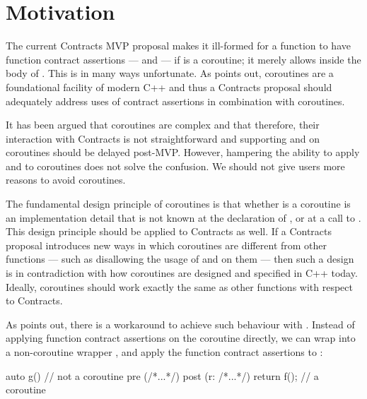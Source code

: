 \section{Motivation}
\label{intro}

The current Contracts MVP proposal \cite{P2900R8} makes it ill-formed for a function  to have function contract assertions ---  and  --- if  is a coroutine; it merely allows  inside the body of . This is in many ways unfortunate. As \cite{P3173R0} points out, coroutines are a foundational facility of modern C++ and thus a Contracts proposal should adequately address uses of contract assertions in combination with coroutines.

It has been argued that coroutines are complex and that therefore, their interaction with Contracts is not straightforward and supporting  and  on coroutines should be delayed post-MVP. However, hampering the ability to apply  and  to coroutines does not solve the confusion. We should not give users more reasons to avoid coroutines.

The fundamental design principle of coroutines is that whether  is a coroutine is an implementation detail that is not known at the declaration of , or at a call to . This design principle should be applied to Contracts as well. If a Contracts proposal introduces new ways in which coroutines are different from other functions --- such as disallowing the usage of  and  on them --- then such a design is in contradiction with how coroutines are designed and specified in C++ today. Ideally, coroutines should work exactly the same as other functions with respect to Contracts.

As \cite{P3251R0} points out, there is a workaround to achieve such behaviour with \cite{P2900R8}. Instead of applying function contract assertions on the coroutine  directly, we can wrap  into a non-coroutine wrapper , and apply the function contract assertions to :
\begin{codeblock}
auto g()  // not a coroutine
pre (/*...*/) 
post (r: /*...*/) { 
  return f();  // a coroutine
} 
\end{codeblock}

